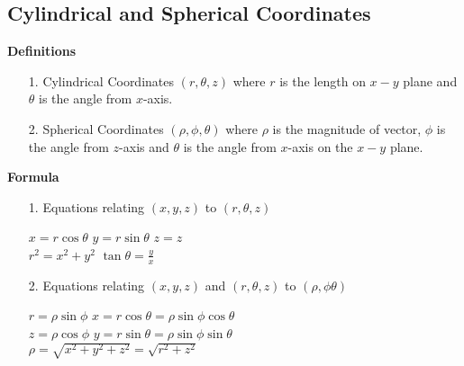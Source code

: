 \documentclass[10pt, twocolumn]{article}
\begin{document}
\subsection{Cylindrical and Spherical Coordinates}
{\bf Definitions}
\begin{enumerate}
\item[1.]{Cylindrical Coordinates}
\newline
$(r,\theta,z)$
\newline
where $r$ is the length on $x-y$ plane and $\theta$ is the angle from $x$-axis.
\item[2.]{Spherical Coordinates}
\newline
$(\rho,\phi,\theta)$
\newline
where $\rho$ is the magnitude of vector, $\phi$ is the angle from $z$-axis and $\theta$ is the angle from $x$-axis on the $x-y$ plane.
\end{enumerate}
{\bf Formula}
\begin{enumerate}
\item[1.]{Equations relating $(x,y,z)$ to $(r,\theta,z)$}
\begin{center}
$x = r\cos\theta$ \hspace{20pt} $y = r\sin\theta$ \hspace{20pt} $z = z$ \\
$r^2 = x^2 + y^2$ \hspace{20pt} $\tan\theta = \frac{y}{x}$
\end{center}
\item[2.]{Equations relating $(x,y,z)$ and $(r,\theta,z)$ to $(\rho,\phi\theta)$}
\begin{center}
$r = \rho\sin\phi$ \hspace{20pt} $x = r\cos\theta = \rho\sin\phi\cos\theta$ \\
$z = \rho\cos\phi$ \hspace{20pt} $y = r\sin\theta = \rho\sin\phi\sin\theta$ \\
$\rho = \sqrt{x^2+y^2+z^2} = \sqrt{r^2+z^2}$
\end{center}
\end{enumerate}
\end{document}

